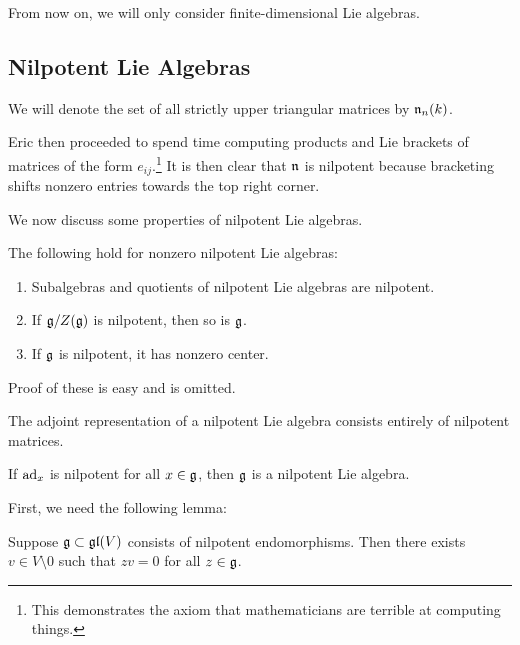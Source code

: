 \documentclass[twoside, 10pt]{article}
\begin{document}
    \begin{rmk}
        From now on, we will only consider finite-dimensional Lie algebras.
    \end{rmk}
    
    \subsection{Nilpotent Lie Algebras}%
    \label{sub:nilpotent_lie_algebras}
    
    
    \begin{notn}
        We will denote the set of all strictly upper triangular matrices by $\mathfrak{n}_n(k)$.
    \end{notn}

    Eric then proceeded to spend time computing products and Lie brackets of matrices of the form $e_{ij}$.\footnote{This demonstrates the axiom that mathematicians are terrible at computing things.} It is then clear that $\mathfrak{n}$ is nilpotent because bracketing shifts nonzero entries towards the top right corner.

    We now discuss some properties of nilpotent Lie algebras.

    \begin{prop}
        The following hold for nonzero nilpotent Lie algebras:
        \begin{enumerate}
            \item Subalgebras and quotients of nilpotent Lie algebras are nilpotent.
            \item If $\mathfrak{g}/Z(\mathfrak{g})$ is nilpotent, then so is $\mathfrak{g}$.
            \item If $\mathfrak{g}$ is nilpotent, it has nonzero center.
        \end{enumerate}
    \end{prop}

    Proof of these is easy and is omitted.

    \begin{rmk}
        The adjoint representation of a nilpotent Lie algebra consists entirely of nilpotent matrices.
    \end{rmk}

    \begin{thm}[Engel]
        If $\operatorname{ad}_x$ is nilpotent for all $x \in \mathfrak{g}$, then $\mathfrak{g}$ is a nilpotent Lie algebra.
    \end{thm}

    First, we need the following lemma:

    \begin{lem}
        Suppose $\mathfrak{g} \subset \mathfrak{gl}(V)$ consists of nilpotent endomorphisms. Then there exists $v \in V \setminus 0$ such that $zv = 0$ for all $z \in \mathfrak{g}$.
    \end{lem}
\end{document}
